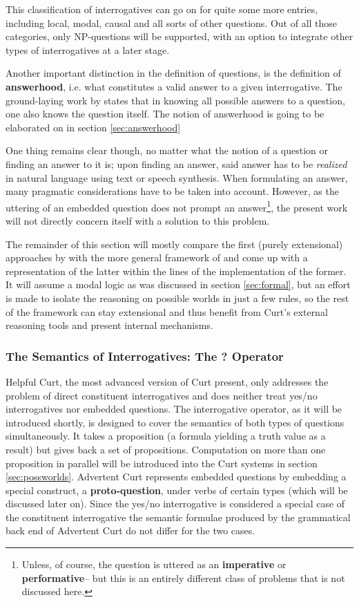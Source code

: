 \documentclass[a4paper]{article}
\newcommand{\term}[1]{\textsf{\textbf{#1}}} %
\newcommand{\pn}{\textsf} %
\newcommand{\curt}{\pn{Curt}}
\newcommand{\acurt}{\pn{Advertent Curt}}
\theoremstyle{remark}
\theoremstyle{remark}
\theoremstyle{definition}
\theoremstyle{definition}
\begin{document}
This classification of interrogatives can go on for quite some more entries,
including local, modal, causal and all sorts of other questions. Out of all
those categories, only NP-questions will be supported, with an option to
integrate other types of interrogatives at a later stage.


Another important distinction in the definition of questions, is the definition
of \term{answerhood}, i.e. what constitutes a valid answer to a given
interrogative. The ground-laying work by \cite{hamblin:q} states that in knowing
all possible answers to a question, one also knows the question itself. The
notion of answerhood is going to be elaborated on in section \ref{sec:answerhood}

One thing remains clear though, no matter what the notion of a question or
finding an answer to it is; upon
finding an answer, said answer has to be \emph{realized} in natural language
using text or speech synthesis. When formulating an answer, many pragmatic
considerations have to be taken into account.
However, as the uttering of an embedded question does not prompt an
answer\footnote{Unless, of course, the question is uttered as an
\term{imperative} or \term{performative}-- but this is an entirely different
class of problems that is not discussed here.}, the present
work will not directly concern itself with a solution to this problem.

The remainder of this section will mostly compare the first (purely extensional)
approaches by \cite{blackburnbos:cl1} with the more general framework of
\cite{gs:q} and come up with a representation of the latter within the lines of
the implementation of the former. It will assume a modal logic as was discussed
in section \ref{sec:formal}, but an effort is made to isolate the reasoning on
possible worlds in just a few rules, so the rest of the framework can stay
extensional and thus benefit from \curt's external reasoning tools and present
internal mechanisms.

\subsubsection{The Semantics of Interrogatives: The ? Operator}\label{sec:protoq}

\pn{Helpful Curt}, the most advanced version of \curt{} \cite{blackburnbos:cl1}
present, only addresses the problem of direct constituent interrogatives and
does neither treat yes/no interrogatives nor embedded questions. The
interrogative operator, as it will be introduced shortly, is designed to cover
the semantics of both types of questions simultaneously. It takes a proposition
(a formula yielding a truth value as a result) but gives back a set of
propositions. Computation on more than one proposition in parallel will be
introduced into the \curt{} systems in section \ref{sec:possworlds}.  \acurt{}
represents embedded questions by embedding a special construct, a
\term{proto-question}, under verbs of certain types (which will be discussed
later on). Since the yes/no interrogative is considered a special case of the
constituent interrogative the semantic formulae produced by the grammatical
back end of \acurt{} do not differ for the two cases.
\end{document}
